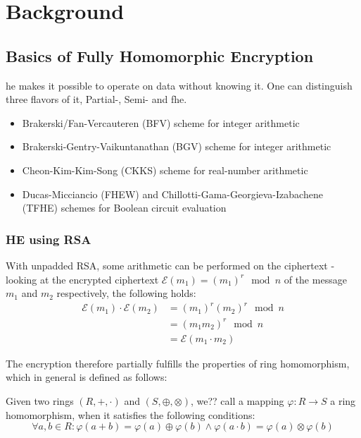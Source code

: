 \chapter{Background}
\label{chap:background}

\section{Basics of Fully Homomorphic Encryption}
\gls{he} makes it possible to operate on data without knowing it.
One can distinguish three flavors of it, Partial-, Semi- and \gls{fhe}.

\begin{itemize}
    \item Brakerski/Fan-Vercauteren (BFV) scheme for integer arithmetic
    \item Brakerski-Gentry-Vaikuntanathan (BGV) scheme for integer arithmetic
    \item Cheon-Kim-Kim-Song (CKKS) scheme for real-number arithmetic
    \item Ducas-Micciancio (FHEW) and Chillotti-Gama-Georgieva-Izabachene (TFHE) schemes for Boolean circuit evaluation
\end{itemize}

\subsection{HE using RSA}
With unpadded RSA, some arithmetic can be performed on the ciphertext - looking at the encrypted ciphertext $\mathcal{E}(m_1) = (m_1)^r \mod n$ of the message $m_1$ and $m_2$ respectively, the following holds:
\begin{align}
    \mathcal{E}(m_1) \cdot \mathcal{E}(m_2)
    &= (m_1)^r (m_2)^r \mod n \\
    &= (m_1 m_2)^r \mod n \\
    &= \mathcal{E}(m_1 \cdot m_2)
\end{align}

The encryption therefore partially fulfills the properties of ring homomorphism, which in general is defined as follows:

\begin{definition}
    Given two rings $(R, +, \cdot)$ and $(S, \oplus, \otimes)$, we?? call a mapping $\varphi: R \rightarrow S$ a ring homomorphism, when it satisfies the following conditions:
    $$\forall a, b \in R: \varphi(a + b) = \varphi(a) \oplus \varphi(b) \wedge \varphi(a \cdot b) = \varphi(a) \otimes \varphi(b)$$
\end{definition}

